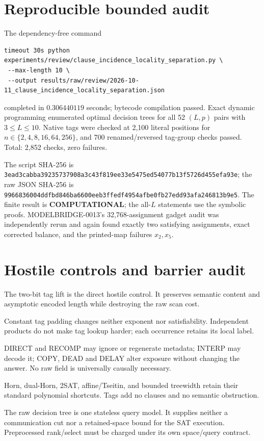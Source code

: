 \documentclass[11pt]{article}
\newcommand{\COMP}{\textbf{COMPUTATIONAL}}
\begin{document}
\section{Reproducible bounded audit}

The dependency-free command
\begin{verbatim}
timeout 30s python experiments/review/clause_incidence_locality_separation.py \
 --max-length 10 \
 --output results/raw/review/2026-10-11_clause_incidence_locality_separation.json
\end{verbatim}
completed in $0.306440119$ seconds; bytecode compilation passed.  Exact
dynamic programming enumerated optimal decision trees for all 52
$(L,p)$ pairs with $3\le L\le10$.  Native tags were checked at 2,100 literal
positions for $n\in\{2,4,8,16,64,256\}$, and 700 renamed/reversed tag-group
checks passed.  Total: 2,852 checks, zero failures.

The script SHA-256 is
\nolinkurl{3ead3cabba39235737908a3c43f819ee33e5475ed54077b13f5726d455efa93e};
the raw JSON SHA-256 is
\nolinkurl{9966836004ddfbd846ba6600eeb3ffedf4954afbe0fb27edd93afa246813b9e5}.
The finite result is \COMP; the all-$L$ statements use the symbolic proofs.
MODELBRIDGE-0013's 32,768-assignment gadget audit was independently rerun
and again found exactly two satisfying assignments, exact corrected balance,
and the printed-map failures $x_2,x_5$.

\section{Hostile controls and barrier audit}

\begin{description}[leftmargin=3.0cm,style=nextline]
\item[Alternative encodings.] The two-bit tag lift is the direct hostile
control.  It preserves semantic content and asymptotic encoded length while
destroying the raw scan cost.
\item[Padding and products.] Constant tag padding changes neither exponent
nor satisfiability.  Independent products do not make tag lookup harder;
each occurrence retains its local label.
\item[Wrappers.] DIRECT and RECOMP may ignore or regenerate metadata;
INTERP may decode it; COPY, DEAD and DELAY alter exposure without changing
the answer.  No raw field is universally causally necessary.
\item[Easy semantics.] Horn, dual-Horn, 2SAT, affine/Tseitin, and bounded
treewidth retain their standard polynomial shortcuts.  Tags add no clauses
and no semantic obstruction.
\item[Communication/memory.] The raw decision tree is one stateless query
model.  It supplies neither a communication cut nor a retained-space bound
for the SAT execution.  Preprocessed rank/select must be charged under its
own space/query contract.
\end{description}
\end{document}
